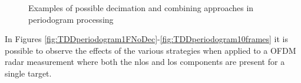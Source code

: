 \begin{figure}[H]
		        \hfill
		        
		        \caption{Examples of possible decimation and combining approaches in periodogram processing}
		        \label{fig:allperiodogram-decimation}
		    \end{figure}
		
		    In Figures \ref{fig:TDDperiodogram1FNoDec}-\ref{fig:TDDperiodogram10frames} it is possible to observe the effects of the various strategies when applied to a OFDM radar measurement where both the \gls{nlos} and \gls{los} components are present for a single target.
		
		
		    

